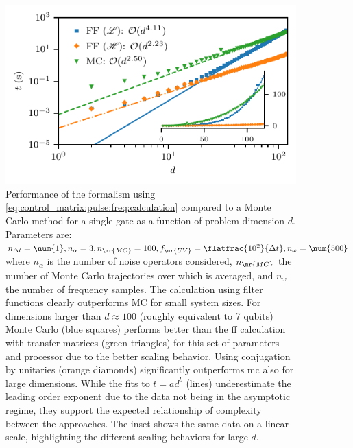 \begin{figure}[tbp]
    \centering
    \includegraphics{img/benchmark_MC_vs_FF_linear-inset.pdf}
    \caption{Performance of the formalism using \cref{eq:control_matrix:pulse:freq:calculation} compared to a Monte Carlo method for a single gate as a function of problem dimension $d$. Parameters are: $n_{\Delta t} = \num{1}, n_\alpha = 3, n_\mr{MC} = 100, f_\mr{UV} = \flatfrac{10^2}{\Delta t}, n_\omega = \num{500}$ where $n_\alpha$ is the number of noise operators considered, $n_\mr{MC}$ the number of Monte Carlo trajectories over which is averaged, and $n_\omega$ the number of frequency samples. The calculation using filter functions clearly outperforms MC for small system sizes. For dimensions larger than $d\approx\num{100}$ (roughly equivalent to 7 qubits) Monte Carlo (blue squares) performs better than the \gls{ff} calculation with transfer matrices (green triangles) for this set of parameters and processor due to the better scaling behavior. Using conjugation by unitaries (orange diamonds) significantly outperforms \gls{mc} also for large dimensions. While the fits to $t = a d^b$ (lines) underestimate the leading order exponent due to the data not being in the asymptotic regime, they support the expected relationship of complexity between the approaches. The inset shows the same data on a linear scale, highlighting the different scaling behaviors for large $d$.}
    \label{fig:performance:MC_vs_FF}
\end{figure}

